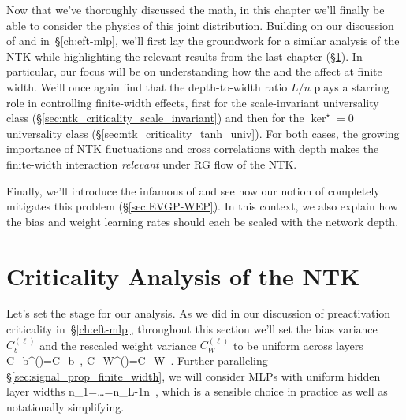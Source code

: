 Now that we've thoroughly discussed the math,
in this chapter we'll finally be able to consider the physics of this joint distribution.
Building on our discussion of  and  in~\S\ref{ch:eft-mlp}, we'll first lay the groundwork for a similar analysis of the NTK while highlighting the relevant results from the last chapter (\S\ref{sec:ntk_criticality}).
In particular, our focus will be on understanding how the  and the  affect  at finite width.
We'll once again find that the depth-to-width ratio $L/n$ plays a starring role in controlling finite-width effects, first for the scale-invariant universality class (\S\ref{sec:ntk_criticality_scale_invariant}) and then for the $\ker^\star=0$ universality class (\S\ref{sec:ntk_criticality_tanh_univ}).
For both cases, the growing importance of NTK fluctuations and cross correlations with depth makes the finite-width interaction \emph{relevant} under RG flow of the NTK.

Finally, we'll introduce the infamous  of  and see how our notion of  completely mitigates this problem (\S\ref{sec:EVGP-WEP}). In this context, we also explain how the bias and weight learning rates should each be scaled with the network depth.


\section{Criticality Analysis of the NTK}\label{sec:ntk_criticality}
Let's set the stage for our  analysis.
As we did in our discussion of preactivation criticality in~\S\ref{ch:eft-mlp}, throughout this section we'll set the bias variance $C_b^{(\ell)}$ and the rescaled weight variance $C_W^{(\ell)}$ to be uniform across layers
\be\label{eq:ntk-chapter-initialziation-hyperparameters-dropped-layer-dependence}
C_b^{(\ell)}=C_b\, , \qquad C_W^{(\ell)}=C_W\, .
\ee
Further paralleling 
\S\ref{sec:signal_prop_finite_width}, we will consider MLPs with uniform hidden layer widths
\be\label{eq:ntk-chapter-layer-widths-equalized}
n_1=\ldots=n_{L-1}\equiv n\, ,
\ee
which is a sensible choice in practice
as well as notationally simplifying.


